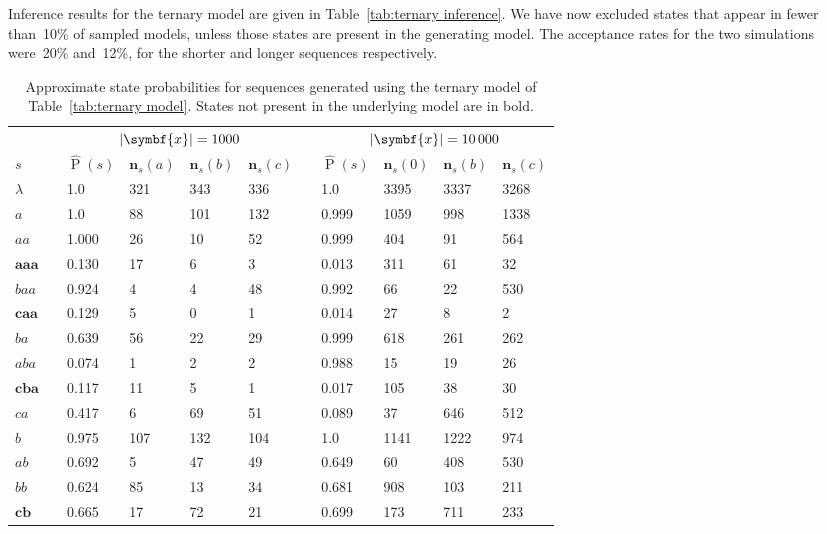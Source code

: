 \documentclass[11pt,a4paper]{article}
\newcommand\ub[1]{\symbf{#1}}                 %
\DeclareMathOperator\Pb{P}                    %
\DeclarePairedDelimiter\abs{\lvert}{\rvert}   %
\begin{document}
Inference results for the ternary model are given in Table~\ref{tab:ternary
inference}. We have now excluded states that appear in fewer than~10\% of
sampled models, unless those states are present in the generating model. The
acceptance rates for the two simulations were~20\% and~12\%, for the shorter and
longer sequences respectively.
%
\begin{table}[htbp]
\centering
\begin{tabular}{lcllllcllll}
  \toprule
  && \multicolumn{4}{c}{\(\abs{\ub{x}} = 1000\)}
  && \multicolumn{4}{c}{\(\abs{\ub{x}} = 10\,000\)} \\
  \cmidrule{3-6} \cmidrule{8-11}
  \(s\)
  && \(\hat{\Pb}(s)\) & \(\ub{n}_s(a)\) & \(\ub{n}_s(b)\) & \(\ub{n}_s(c)\)
  && \(\hat{\Pb}(s)\) & \(\ub{n}_s(0)\) & \(\ub{n}_s(b)\) & \(\ub{n}_s(c)\) \\
  \midrule
  \(\lambda\)  && 1.0   & 321 & 343 & 336 && 1.0   & 3395 & 3337 & 3268 \\
  \(a\)        && 1.0   & 88  & 101 & 132 && 0.999 & 1059 & 998  & 1338 \\
  \(aa\)       && 1.000 & 26  & 10  & 52  && 0.999 & 404  & 91   & 564  \\
  \(\ub{aaa}\) && 0.130 & 17  & 6   & 3   && 0.013 & 311  & 61   & 32   \\
  \(baa\)      && 0.924 & 4   & 4   & 48  && 0.992 & 66   & 22   & 530  \\
  \(\ub{caa}\) && 0.129 & 5   & 0   & 1   && 0.014 & 27   & 8    & 2    \\
  \(ba\)       && 0.639 & 56  & 22  & 29  && 0.999 & 618  & 261  & 262  \\
  \(aba\)      && 0.074 & 1   & 2   & 2   && 0.988 & 15   & 19   & 26   \\
  \(\ub{cba}\) && 0.117 & 11  & 5   & 1   && 0.017 & 105  & 38   & 30   \\
  \(ca\)       && 0.417 & 6   & 69  & 51  && 0.089 & 37   & 646  & 512  \\
  \(b\)        && 0.975 & 107 & 132 & 104 && 1.0   & 1141 & 1222 & 974  \\
  \(ab\)       && 0.692 & 5   & 47  & 49  && 0.649 & 60   & 408  & 530  \\
  \(bb\)       && 0.624 & 85  & 13  & 34  && 0.681 & 908  & 103  & 211  \\
  \(\ub{cb}\)  && 0.665 & 17  & 72  & 21  && 0.699 & 173  & 711  & 233  \\
  \bottomrule
\end{tabular}
\caption{Approximate state probabilities for sequences generated using the
  ternary model of Table~\ref{tab:ternary model}. States not present in the
  underlying model are in bold.}
\label{tab:ternary inference}
\end{table}
\end{document}

